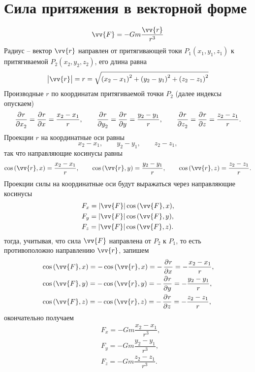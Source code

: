 \documentclass[11pt, a4paper]{article}
\theoremstyle{plain}
\theoremstyle{definition}
\theoremstyle{remark}
\begin{document}
\section{Сила притяжения в векторной форме}
\begin{equation*}
    \vv{F} = -Gm\dfrac{\vv{r}}{r^3}
\end{equation*}
Радиус -- вектор $\vv{r}$ направлен от притягивающей токи $P_1 (x_1, y_1, z_1)$ к притягиваемой $P_2
(x_2, y_2, z_2)$, его длина равна
\begin{equation*}
    \left| \vv{r}\right| = r = \sqrt{\left( x_2 - x_1 \right)^2 +
    \left( y_2 - y_1 \right)^2 + \left( z_2 - z_1 \right)^2}
\end{equation*}
Производные $r$ по координатам притягиваемой точки $P_2$ (далее индексы опускаем)
\begin{equation*}
    \dpd{r}{x_2} = \dpd{r}{x} = \dfrac{x_2 - x_1}{r},\qquad
    \dpd{r}{y_2} = \dpd{r}{y} =  \dfrac{y_2 - y_1}{r},\qquad
    \dpd{r}{z_2} = \dpd{r}{z} = \dfrac{z_2 - z_1}{r}. 
\end{equation*}
Проекции $r$ на координатные оси равны
\begin{equation*}
    x_2 - x_1,\qquad y_2 - y_1, \qquad z_2 - z_1,
\end{equation*}
так что направляющие косинусы равны
\begin{equation*}
    \cos{(\vv{r}, x)} = \dfrac{x_2 - x_1}{r},\qquad \cos{(\vv{r}, y)} = \dfrac{y_2 - y_1}{r},\qquad
    \cos{(\vv{r}, z)} = \dfrac{z_2 - z_1}{r}.
\end{equation*}
Проекции силы на координатные оси будут выражаться через направляющие косинусы
\begin{align*}
    & F_x = |\vv{F}|\cos{(\vv{F}, x)}, \\
    & F_y = |\vv{F}|\cos{(\vv{F}, y)}, \\
    & F_z = |\vv{F}|\cos{(\vv{F}, z)}. 
\end{align*}
тогда, учитывая, что сила $\vv{F}$ направлена от $P_2$ к $P_1$, то есть противоположно направлению
$\vv{r}$, запишем
\begin{align*}
    & \cos{(\vv{F}, x)} = -\cos{(\vv{r}, x)} = -\dpd{r}{x} = -\dfrac{x_2 - x_1}{r}, \\
    & \cos{(\vv{F}, y)} = -\cos{(\vv{r}, y)} = -\dpd{r}{y} = -\dfrac{y_2 - y_1}{r}, \\
    & \cos{(\vv{F}, z)} = -\cos{(\vv{r}, z)} = -\dpd{r}{z} = -\dfrac{z_2 - z_1}{r}, 
\end{align*}
окончательно получаем
\begin{align*}
    & F_x = -Gm \dfrac{x_2 - x_1}{r^3}, \\
    & F_y = -Gm \dfrac{y_2 - y_1}{r^3}, \\
    & F_z = -Gm \dfrac{z_2 - z_1}{r^3}. \\
\end{align*}
\end{document}
